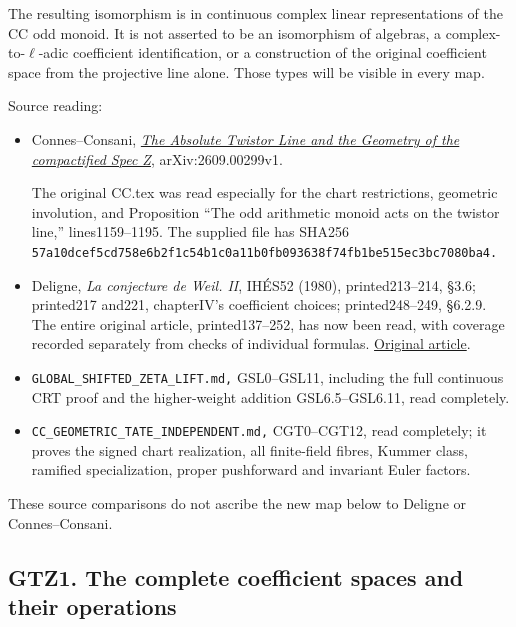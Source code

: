 The resulting isomorphism is in continuous complex linear
representations of the CC odd monoid. It is not asserted to be an
isomorphism of algebras, a complex-to-\(\ell\)-adic coefficient
identification, or a construction of the original coefficient space from
the projective line alone. Those types will be visible in every map.

Source reading:

\begin{itemize}
\item
  Connes--Consani, \href{https://arxiv.org/html/2609.00299v1}{\emph{The
  Absolute Twistor Line and the Geometry of the compactified Spec Z}},
  arXiv:2609.00299v1.

  The original CC.tex was read especially for the chart restrictions,
  geometric involution, and Proposition ``The odd arithmetic monoid acts
  on the twistor line,'' lines1159--1195. The supplied file has SHA256
  \nolinkurl{57a10dcef5cd758e6b2f1c54b1c0a11b0fb093638f74fb1be515ec3bc7080ba4.}
\item
  Deligne, \emph{La conjecture de Weil. II}, IHÉS52 (1980),
  printed213--214, §3.6; printed217 and221, chapterIV's coefficient
  choices; printed248--249, §6.2.9. The entire original article,
  printed137--252, has now been read, with coverage recorded separately
  from checks of individual formulas.
  \href{https://www.numdam.org/item/PMIHES_1980__52__137_0/}{Original
  article}.
\item
  \nolinkurl{GLOBAL_SHIFTED_ZETA_LIFT.md,} GSL0--GSL11, including the
  full continuous CRT proof and the higher-weight addition
  GSL6.5--GSL6.11, read completely.
\item
  \nolinkurl{CC_GEOMETRIC_TATE_INDEPENDENT.md,} CGT0--CGT12, read
  completely; it proves the signed chart realization, all finite-field
  fibres, Kummer class, ramified specialization, proper pushforward and
  invariant Euler factors.
\end{itemize}

These source comparisons do not ascribe the new map below to Deligne or
Connes--Consani.

\subsection{GTZ1. The complete coefficient spaces and their
operations}\label{gtz1.-the-complete-coefficient-spaces-and-their-operations}

